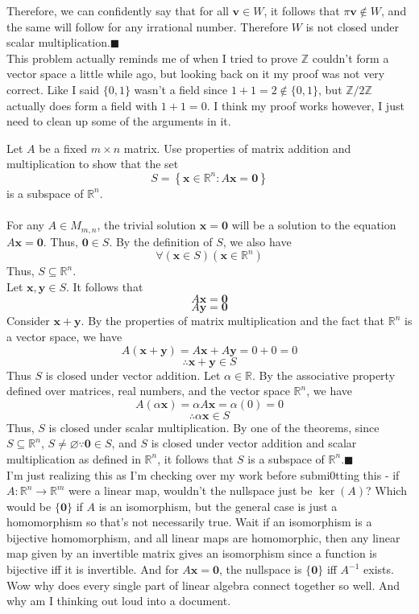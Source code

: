 \documentclass{article}
\begin{document}
Therefore, we can confidently say that for all \(\mathbf{v} \in W\), it follows that \(\pi \mathbf{v} \notin W\), and the same will follow for any irrational number. Therefore \(W\) is not closed under scalar multiplication.\hfill\(\blacksquare\)\\
This problem actually reminds me of when I tried to prove \(\mathbb{Z} \) couldn't form a vector space a little while ago, but looking back on it my proof was not very correct. Like I said \(\{ 0,1 \} \) wasn't a field since \(1+1=2\notin \{ 0,1 \} \), but \(\mathbb{Z} /2\mathbb{Z} \) actually does form a field with \(1+1=0\). I think my proof works however, I just need to clean up some of the arguments in it.


\newpage
{} Let $A$ be a fixed $m \times n$ matrix.  Use properties of matrix addition and multiplication to show that 
the set 
\[ S = \left\{ \mathbf{x}  \in \mathbb{R}^n  :  A \mathbf{x} = \mathbf{0}  \right\} \] 
is a subspace of $\mathbb{R}^n$.\\
\noindent\makebox[\linewidth]{\rule{\linewidth}{0.4pt}}\\
For any \(A\in M_{m,n}\), the trivial solution \(\mathbf{x} =\mathbf{0} \) will be a solution to the equation \(A \mathbf{x} =\mathbf{0} \). Thus, \(\mathbf{0} \in S\). By the definition of \(S\), we also have 
\[
  \forall (\mathbf{x} \in S)\left( \mathbf{x} \in\mathbb{R} ^n \right)
\]
Thus, \(S \subseteq \mathbb{R} ^n\).\\
Let \(\mathbf{x} ,\mathbf{y} \in S\). It follows that
\[
  A \mathbf{x} =\mathbf{0}
\]
\[
  A \mathbf{y} =\mathbf{0} 
\]
Consider \(\mathbf{x} +\mathbf{y}\). By the properties of matrix multiplication and the fact that \(\mathbb{R} ^n\) is a vector space, we have
\[
  A(\mathbf{x} +\mathbf{y} )= A \mathbf{x} +A \mathbf{y}=0+0=0
\]
\[
  \therefore \mathbf{x} +\mathbf{y} \in S
\]
Thus \(S\) is closed under vector addition. Let \(\alpha \in \mathbb{R} \). By the associative property defined over matrices, real numbers, and the vector space \(\mathbb{R}^n\), we have 
\[
  A(\alpha \mathbf{x} )=\alpha A \mathbf{x}=\alpha (0)=0
\]
\[
  \therefore \alpha \mathbf{x} \in S
\]
Thus, \(S\) is closed under scalar multiplication. By one of the theorems, since \(S\subseteq \mathbb{R}^n\), \(S \neq \varnothing \because \mathbf{0}\in S \), and \(S\) is closed under vector addition and scalar multiplication as defined in \(\mathbb{R} ^n\), it follows that \(S\) is a subspace of \(\mathbb{R}^n\).\hfill\(\blacksquare\)\\
I'm just realizing this as I'm checking over my work before submi0tting this - if \(A:\mathbb{R} ^n \to \mathbb{R} ^m\) were a linear map, wouldn't the nullspace just be \(\ker (A)\)? Which would be \(\{  \mathbf{0}  \} \) if \(A\) is an isomorphism, but the general case is just a homomorphism so that's not necessarily true. Wait if an isomorphism is a bijective homomorphism, and all linear maps are homomorphic, then any linear map given by an invertible matrix gives an isomorphism since a function is bijective iff it is invertible. And for \(A \mathbf{x} =\mathbf{0} \), the nullspace is \(\{ \mathbf{0}  \} \) iff \(A^{-1} \) exists. Wow why does every single part of linear algebra connect together so well. And why am I thinking out loud into a document.
\end{document}
